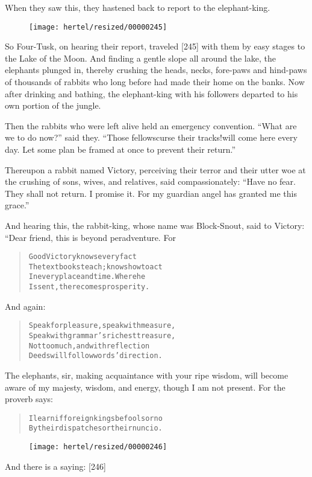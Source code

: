 \documentclass[article, twoside, 10pt]{memoir}
\renewenvironment{verbatim}{%
\begin{quote}%
\vskip -10pt%
\begin{alltt}\normalfont\small}{\end{alltt}%
\end{quote}%
\vskip -10pt
} %
\begin{document}
When they saw this, they hastened back to report to the
elephant-king.

\begin{figure}[p]\texttt{[image: hertel/resized/00000245]}\end{figure}So Four-Tusk, on hearing their report, traveled [245] with them by
easy stages to the Lake of the Moon. And finding a gentle slope all
around the lake, the elephants plunged in, thereby crushing the
heads, necks, fore-paws and hind-paws of thousands of rabbits who
long before had made their home on the banks. Now after drinking
and bathing, the elephant-king with his followers departed to his
own portion of the jungle.

Then the rabbits who were left alive held an emergency convention.
``What are we to do now?'' said they.
``Those fellows{\textemdash}curse their tracks!{\textemdash}will come here every day. Let some plan be framed at once to prevent their return.''

Thereupon a rabbit named Victory, perceiving their terror and their
utter woe at the crushing of sons, wives, and relatives, said
compassionately:
``Have no fear. They shall not return. I promise it. For my guardian angel has granted me this grace.''

And hearing this, the rabbit-king, whose name was Block-Snout, said
to Victory: “Dear friend, this is beyond peradventure. For

\begin{verbatim}
Good Victory knows every fact
The textbooks teach; knows how to act
In every place and time. Where he
Is sent, there comes prosperity.
\end{verbatim}
And again:

\begin{verbatim}
Speak for pleasure, speak with measure,
Speak with grammar's richest treasure,
Not too much, and with reflection{\textemdash}
Deeds will follow words' direction.
\end{verbatim}
The elephants, sir, making acquaintance with your ripe wisdom, will
become aware of my majesty, wisdom, and energy, though I am not
present. For the proverb says:

\begin{verbatim}
I learn if foreign kings be fools or no
By their dispatches or their nuncio.
\end{verbatim}
\begin{figure}[p]\texttt{[image: hertel/resized/00000246]}\end{figure}And there is a saying: [246]
\end{document}
